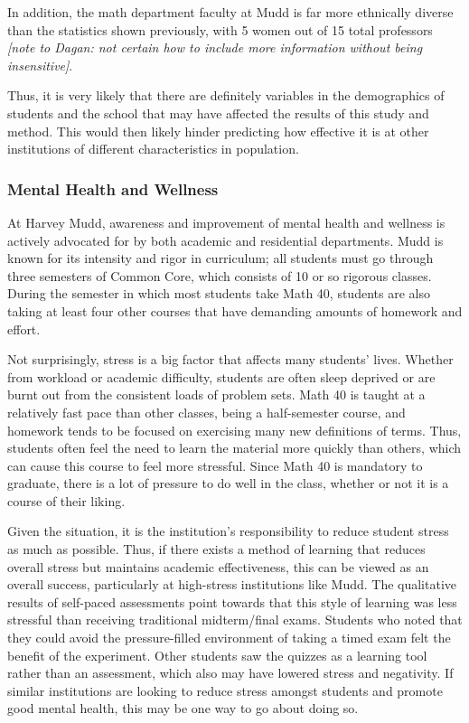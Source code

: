 In addition, the math department faculty at Mudd is far more ethnically diverse than the statistics shown previously, with 5 women out of 15 total professors \textit{[note to Dagan: not certain how to include more information without being insensitive]}.

Thus, it is very likely that there are definitely variables in the demographics of students and the school that may have affected the results of this study and method. This would then likely hinder predicting how effective it is at other institutions of different characteristics in population.

\subsubsection{Mental Health and Wellness}
At Harvey Mudd, awareness and improvement of mental health and wellness is actively advocated for by both academic and residential departments. Mudd is known for its intensity and rigor in curriculum; all students must go through three semesters of Common Core, which consists of 10 or so rigorous classes. During the semester in which most students take Math 40, students are also taking at least four other courses that have demanding amounts of homework and effort.

Not surprisingly, stress is a big factor that affects many students' lives. Whether from workload or academic difficulty, students are often sleep deprived or are burnt out from the consistent loads of problem sets. Math 40 is taught at a relatively fast pace than other classes, being a half-semester course, and homework tends to be focused on exercising many new definitions of terms. Thus, students often feel the need to learn the material more quickly than others, which can cause this course to feel more stressful. Since Math 40 is mandatory to graduate, there is a lot of pressure to do well in the class, whether or not it is a course of their liking.

Given the situation, it is the institution's responsibility to reduce student stress as much as possible. Thus, if there exists a method of learning that reduces overall stress but maintains academic effectiveness, this can be viewed as an overall success, particularly at high-stress institutions like Mudd. The qualitative results of self-paced assessments point towards that this style of learning was less stressful than receiving traditional midterm/final exams. Students who noted that they could avoid the pressure-filled environment of taking a timed exam felt the benefit of the experiment. Other students saw the quizzes as a learning tool rather than an assessment, which also may have lowered stress and negativity. If similar institutions are looking to reduce stress amongst students and promote good mental health, this may be one way to go about doing so.

